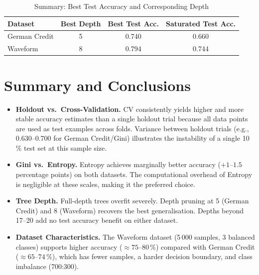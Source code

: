 \documentclass[12pt,a4paper]{article}
\begin{document}
\begin{table}[H]
\centering
\caption{Summary: Best Test Accuracy and Corresponding Depth}
\label{tab:best_depth}
\begin{tabular}{@{}lccc@{}}
\toprule
\textbf{Dataset} & \textbf{Best Depth} & \textbf{Best Test Acc.}
  & \textbf{Saturated Test Acc.} \\
\midrule
German Credit & 5  & 0.740 & 0.660 \\
Waveform      & 8  & 0.794 & 0.744 \\
\bottomrule
\end{tabular}
\end{table}

\section{Summary and Conclusions}

\begin{itemize}
  \item \textbf{Holdout vs.\ Cross-Validation.}
    CV consistently yields higher and more stable accuracy estimates than a
    single holdout trial because all data points are used as test examples
    across folds. Variance between holdout trials (e.g., 0.630--0.700 for
    German Credit/Gini) illustrates the instability of a single 10\,\% test
    set at this sample size.

  \item \textbf{Gini vs.\ Entropy.}
    Entropy achieves marginally better accuracy ($+1$--$1.5$ percentage
    points) on both datasets. The computational overhead of Entropy is
    negligible at these scales, making it the preferred choice.

  \item \textbf{Tree Depth.}
    Full-depth trees overfit severely. Depth pruning at 5 (German Credit)
    and 8 (Waveform) recovers the best generalisation. Depths beyond
    17--20 add no test accuracy benefit on either dataset.

  \item \textbf{Dataset Characteristics.}
    The Waveform dataset (5\,000 samples, 3 balanced classes) supports
    higher accuracy ($\approx 75$--$80\,\%$) compared with German Credit
    ($\approx 65$--$74\,\%$), which has fewer samples, a harder decision
    boundary, and class imbalance (700:300).
\end{itemize}
\end{document}
